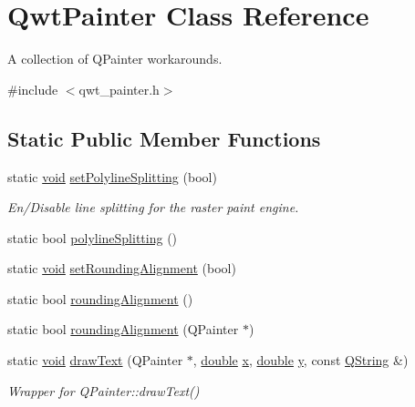 \hypertarget{class_qwt_painter}{\section{Qwt\-Painter Class Reference}
\label{class_qwt_painter}
}


A collection of Q\-Painter workarounds.  




{\ttfamily \#include $<$qwt\-\_\-painter.\-h$>$}

\subsection*{Static Public Member Functions}
\begin{DoxyCompactItemize}
\item 
static \hyperlink{group___u_a_v_objects_plugin_ga444cf2ff3f0ecbe028adce838d373f5c}{void} \hyperlink{class_qwt_painter_a174bca411198c64dfff828a15d80ddfb}{set\-Polyline\-Splitting} (bool)
\begin{DoxyCompactList}\small\item\em En/\-Disable line splitting for the raster paint engine. \end{DoxyCompactList}\item 
static bool \hyperlink{class_qwt_painter_a831cf0efa8a0869ab79307495d7e4590}{polyline\-Splitting} ()
\item 
static \hyperlink{group___u_a_v_objects_plugin_ga444cf2ff3f0ecbe028adce838d373f5c}{void} \hyperlink{class_qwt_painter_a49581f980f2c761852cda08502c96abb}{set\-Rounding\-Alignment} (bool)
\item 
static bool \hyperlink{class_qwt_painter_ae9af230df7bb8d40b802d4f3205a8631}{rounding\-Alignment} ()
\item 
static bool \hyperlink{class_qwt_painter_ab11788d777ce54a1959bf8387dba6ad9}{rounding\-Alignment} (Q\-Painter $\ast$)
\item 
static \hyperlink{group___u_a_v_objects_plugin_ga444cf2ff3f0ecbe028adce838d373f5c}{void} \hyperlink{class_qwt_painter_a7b32c7e2937f7beea38728b9ce445860}{draw\-Text} (Q\-Painter $\ast$, \hyperlink{_super_l_u_support_8h_a8956b2b9f49bf918deed98379d159ca7}{double} \hyperlink{glext_8h_a1db9d104e3c2128177f26aff7b46982f}{x}, \hyperlink{_super_l_u_support_8h_a8956b2b9f49bf918deed98379d159ca7}{double} \hyperlink{glext_8h_a42315f3ed8fff752bb47fd782309fcfc}{y}, const \hyperlink{group___u_a_v_objects_plugin_gab9d252f49c333c94a72f97ce3105a32d}{Q\-String} \&)
\begin{DoxyCompactList}\small\item\em Wrapper for Q\-Painter\-::draw\-Text() \end{DoxyCompactList}\item 

\end{DoxyCompactItemize}
